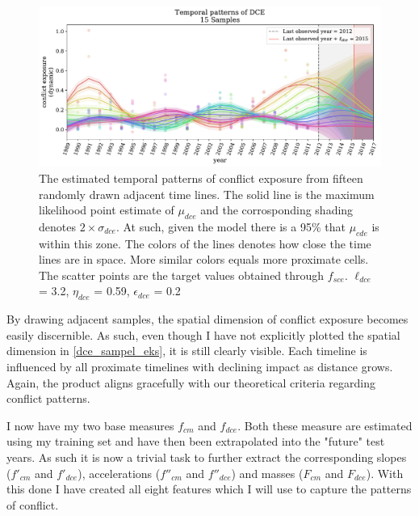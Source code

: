 \documentclass[a4paper]{article}
\begin{document}
\begin{figure}[!htb]
	\centering
	\includegraphics[scale=0.47]{dce_15_samples.pdf}
    \caption{\footnotesize{The estimated temporal patterns of conflict exposure from fifteen randomly drawn adjacent time lines. The solid line is the maximum likelihood point estimate of $\mu_{dce}$ and the corrosponding shading denotes $2\times\sigma_{dce}$. At such, given the model there is a 95\% that $\mu_{cde}$ is within this zone. The colors of the lines denotes how close the time lines are in space. More similar colors equals more proximate cells. The scatter points are the target values obtained through $f_{sce}$. $\ell_{dce}$ = 3.2, $\eta_{dce}$ = 0.59, $\epsilon_{dce}$ = 0.2}}\label{dce_sampel_eks}
\end{figure}

By drawing adjacent samples, the spatial dimension of conflict exposure becomes easily discernible. As such, even though I have not explicitly plotted the spatial dimension in \autoref{dce_sampel_eks}, it is still clearly visible. Each timeline is influenced by all proximate timelines with declining impact as distance grows. Again, the product aligns gracefully with our theoretical criteria regarding conflict patterns.\par

I now have my two base measures $f_{cm}$ and $f_{dce}$. Both these measure are estimated using my training set and have then been extrapolated into the "future" test years. As such it is now a trivial task to further extract the corresponding slopes ($f'_{cm}$ and $f'_{dce}$), accelerations ($f''_{cm}$ and $f''_{dce}$) and masses ($F_{cm}$ and $F_{dce}$). With this done I have created all eight features which I will use to capture the patterns of conflict.\par
\end{document}
